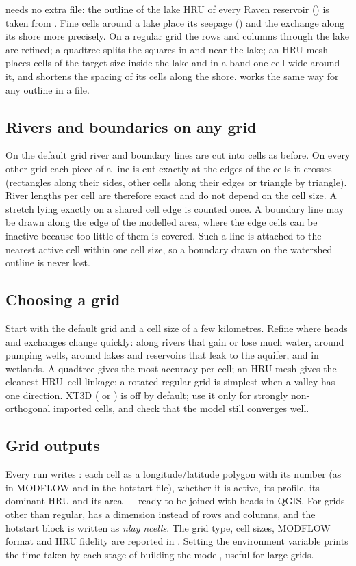  needs no extra file: the outline of the lake HRU of every Raven reservoir () is taken
from . Fine cells around a lake place its seepage () and the exchange along its shore
more precisely. On a regular grid the rows and columns through the lake are refined; a quadtree splits the squares in and
near the lake; an HRU mesh places cells of the target size inside the lake and in a band one cell wide around it, and
shortens the spacing of its cells along the shore.  works the same way for any outline in a file.

\subsection{Rivers and boundaries on any grid}
On the default grid river and boundary lines are cut into cells as before. On every other grid each piece of a line is cut exactly at the edges of the cells it crosses (rectangles along their
sides, other cells along their edges or triangle by triangle). River lengths per cell are therefore exact and do not
depend on the cell size. A stretch lying exactly on a shared cell edge
is counted once. A boundary line may be drawn along the edge of the modelled area, where the edge cells can be inactive because too little
of them is covered. Such a line is attached to the nearest active cell within one cell size, so a boundary drawn on the
watershed outline is never lost.

\subsection{Choosing a grid}
Start with the default grid and a cell size of a few kilometres. Refine where heads and exchanges change quickly: along
rivers that gain or lose much water, around pumping wells, around lakes and reservoirs that leak to the aquifer, and in
wetlands. A quadtree gives the most accuracy per cell;
an HRU mesh gives the cleanest HRU--cell linkage; a rotated regular grid is simplest when a valley has one direction. XT3D
( or ) is off by default; use it only for strongly non-orthogonal imported cells, and
check that the model still converges well.

\subsection{Grid outputs}
Every run writes : each cell as a longitude/latitude polygon with its number (as in MODFLOW and in
the hotstart file), whether it is active, its profile, its dominant HRU and its area --- ready to be joined with heads in
QGIS. For grids other than regular,  has a  dimension instead of rows and columns, and the hotstart
block is written as  \emph{nlay}  \emph{ncells}. The grid type, cell sizes, MODFLOW format and HRU
fidelity are reported in . Setting the environment variable  prints the time
taken by each stage of building the model, useful for large grids.

